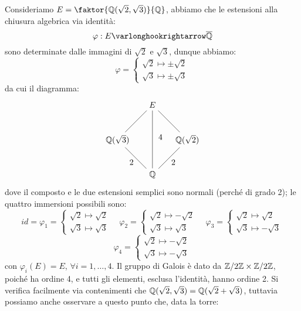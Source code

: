 \documentclass[11pt]{scrartcl}
\begin{document}
\begin{example}
    Consideriamo $E = \faktor{\QQ(\sqrt{2},\sqrt{3})}{\QQ}$, abbiamo che le estensioni alla chiusura algebrica via identità:
    \[ \varphi : E \varlonghookrightarrow \ol\QQ
        \]
    sono determinate dalle immagini di $\sqrt{2}$ e $\sqrt{3}$, dunque abbiamo:
    \[ \varphi = \begin{cases}
        \sqrt{2} \longmapsto \pm \sqrt{2} \\
        \sqrt{3} \longmapsto \pm \sqrt{3}
    \end{cases}
        \]
    da cui il diagramma:
    \[      \begin{tikzpicture}
		    \node (Q1) at (0,0) {$\QQ$};
		    \node (Q2) at (1.5,1.5) {$\QQ(\sqrt{2})$};
		    \node (Q3) at (0,3) {$E$};
		    \node (Q4) at (-1.5,1.5) {$\QQ(\sqrt{3})$};
		    \draw (Q1)--(Q2) node [pos=0.7, below,inner sep=0.25cm] {2};
		    \draw (Q1)--(Q4) node [pos=0.7, below,inner sep=0.25cm] {2};
		    \draw (Q3)--(Q4) node [pos=0.7, above] {};
		    \draw (Q2)--(Q3) node [pos=0.3, above] {};
		    \draw (Q1)--(Q3) node [pos=0.7, below, right,inner sep=0.25cm, yshift=-0.4cm] {$4$};
		    \end{tikzpicture}
        \]
    dove il composto e le due estensioni semplici sono normali (perché di grado 2); le quattro immersioni possibili sono:
    \[ id = \varphi_1 = \begin{cases}
        \sqrt{2} \longmapsto  \sqrt{2} \\
        \sqrt{3} \longmapsto  \sqrt{3}
    \end{cases}
    \quad
    \varphi_2 = \begin{cases}
        \sqrt{2} \longmapsto -\sqrt{2} \\
        \sqrt{3} \longmapsto  \sqrt{3}
    \end{cases}
    \quad
    \varphi_3 = \begin{cases}
        \sqrt{2} \longmapsto  \sqrt{2} \\
        \sqrt{3} \longmapsto  -\sqrt{3}
    \end{cases}
    \]\[
    \varphi_4 = \begin{cases}
        \sqrt{2} \longmapsto -\sqrt{2} \\
        \sqrt{3} \longmapsto -\sqrt{3}
    \end{cases}
        \]
    con $\varphi_i(E) = E$, $\forall i = 1,\ldots,4$. Il gruppo di Galois è dato da $\mathbb{Z}/{2}\mathbb{Z}\times\mathbb{Z}/{2}\mathbb{Z}$, poiché ha ordine 4, e tutti gli elementi, esclusa l'identità, hanno ordine 2.
    Si verifica facilmente via contenimenti che $\mathbb Q(\sqrt{2},\sqrt{3}) = \mathbb Q(\sqrt{2} + \sqrt{3})$, tuttavia possiamo anche osservare a questo punto che, data la torre:

\end{example}
\end{document}
